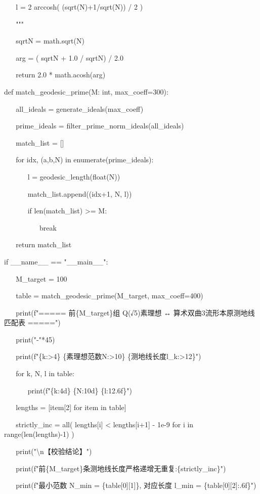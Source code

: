 \documentclass[12pt]{article}
\begin{document}
~ ~ l = 2 arccosh( (sqrt(N)+1/sqrt(N)) / 2 )

~ ~ """

~ ~ sqrtN = math.sqrt(N)

~ ~ arg = ( sqrtN + 1.0 / sqrtN) / 2.0

~ ~ return 2.0 * math.acosh(arg)

def match\_geodesic\_prime(M: int, max\_coeff=300):

~ ~ all\_ideals = generate\_ideals(max\_coeff)

~ ~ prime\_ideals = filter\_prime\_norm\_ideals(all\_ideals)

~ ~ match\_list = {[}{]}

~ ~ for idx, (a,b,N) in enumerate(prime\_ideals):

~ ~ ~ ~ l = geodesic\_length(float(N))

~ ~ ~ ~ match\_list.append((idx+1, N, l))

~ ~ ~ ~ if len(match\_list) \textgreater= M:

~ ~ ~ ~ ~ ~ break

~ ~ return match\_list

if \_\_name\_\_ == "\_\_main\_\_":

~ ~ M\_target = 100

~ ~ table = match\_geodesic\_prime(M\_target, max\_coeff=400)

~ ~ print(f"===== 前\{M\_target\}组 Q(√5)素理想 ↔
算术双曲3流形本原测地线匹配表 =====")

~ ~ print("-"*45)

~ ~ print(f"\{\textquotesingle k\textquotesingle:\textgreater4\}
\textbar{}
\{\textquotesingle 素理想范数N\textquotesingle:\textgreater10\}
\textbar{}
\{\textquotesingle 测地线长度l\_k\textquotesingle:\textgreater12\}")

~ ~ for k, N, l in table:

~ ~ ~ ~ print(f"\{k:4d\} \textbar{} \{N:10d\} \textbar{} \{l:12.6f\}")

~ ~ lengths = {[}item{[}2{]} for item in table{]}

~ ~ strictly\_inc = all( lengths{[}i{]} \textless{} lengths{[}i+1{]} -
1e-9 for i in range(len(lengths)-1) )

~ ~ print("\textbackslash n【校验结论】")

~ ~
print(f"前\{M\_target\}条测地线长度严格递增无重复:\{strictly\_inc\}")

~ ~ print(f"最小范数 N\_min = \{table{[}0{]}{[}1{]}\}, 对应长度 l\_min =
\{table{[}0{]}{[}2{]}:.6f\}")
\end{document}
